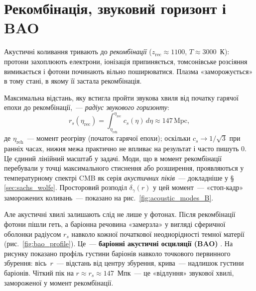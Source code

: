 \section{Рекомбінація, звуковий горизонт і BAO}

Акустичні коливання тривають до \emph{рекомбінації}
($z_\mathrm{rec} \approx 1100$, $T \approx 3000$~К):
протони захоплюють електрони, іонізація припиняється,
томсонівське розсіяння вимикається і фотони починають
вільно поширюватися. Плазма «заморожується» в тому стані,
в якому її застала рекомбінація.

Максимальна відстань, яку встигла пройти звукова хвиля
від початку гарячої епохи до рекомбінації,~---
\emph{радіус звукового горизонту}:
\begin{equation}\label{eq:sound_horizon}
  r_s(\eta_\mathrm{rec})
    = \int_{\eta_\mathrm{reh}}^{\eta_\mathrm{rec}} c_s(\eta)\,d\eta
    \approx 147\,\mathrm{Mpc},
\end{equation}
де $\eta_\mathrm{reh}$~--- момент реогріву (початок гарячої
епохи); оскільки $c_s \to 1/\sqrt{3}$ при ранніх часах,
нижня межа практично не впливає на результат і часто
пишуть $0$.
Це єдиний лінійний масштаб у задачі. Моди, що в момент
рекомбінації перебували у точці максимального стиснення
або розширення, проявляються у температурному спектрі
CMB як серія \emph{акустичних піків}~--- докладніше
у §\,\ref{sec:sachs_wolfe}.
Просторовий розподіл $\delta_\gamma(r)$ у цей момент~---
«стоп-кадр» заморожених коливань~--- показано на
рис.~\ref{fig:acoustic_modes_B}.

Але акустичні хвилі залишають слід не лише у фотонах.
Після рекомбінації фотони пішли геть, а баріонна речовина
«замерзла» у вигляді сферичної оболонки радіусом $r_s$
навколо кожної початкової неоднорідності темної матерії
(рис.~\ref{fig:bao_profile}). Це~--- \textbf{баріонні
акустичні осциляції (BAO)} \cite{eisenstein_2005}.
На рисунку показано профіль густини баріонів навколо
точкового первинного збурення: вісь~$r$~--- відстань
від центру збурення, крива~--- надлишок густини баріонів.
Чіткий пік на $r \approx r_s \approx 147$~Мпк~---
це «відлуння» звукової хвилі, замороженої у момент
рекомбінації.

